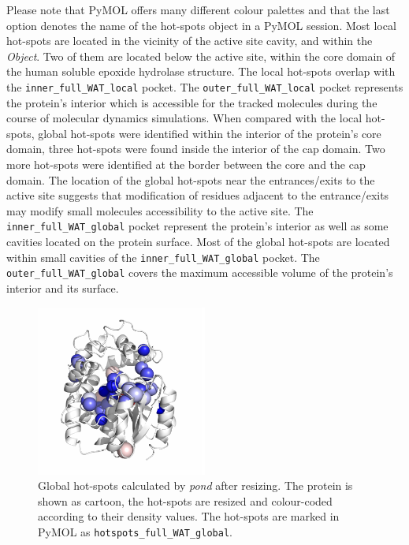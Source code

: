 \documentclass[9pt,tutorial]{livecoms}
\begin{document}
Please note that PyMOL offers many different colour palettes and that the last option denotes the name of the hot-spots object in a PyMOL session. Most local hot-spots are located in the vicinity of the active site cavity, and within the \emph{Object}. Two of them are located below the active site, within the core domain of the human soluble epoxide hydrolase structure. The local hot-spots overlap with the \texttt{inner\_full\_WAT\_local} pocket. The \texttt{outer\_full\_WAT\_local} pocket represents the protein's interior which is accessible for the tracked molecules during the course of molecular dynamics simulations. When compared with the local hot-spots, global hot-spots were identified within the interior of the protein's core domain, three hot-spots were found inside the interior of the cap domain. Two more hot-spots were identified at the border between the core and the cap domain. The location of the global hot-spots near the entrances/exits to the active site suggests that modification of residues adjacent to the entrance/exits may modify small molecules accessibility to the active site. The \texttt{inner\_full\_WAT\_global} pocket represent the protein's interior as well as some cavities located on the protein surface. Most of the global hot-spots are located within small cavities of the \texttt{inner\_full\_WAT\_global} pocket. The \texttt{outer\_full\_WAT\_global} covers the maximum accessible volume of the protein's interior and its surface.

\begin{figure}[ht!]
\centering
\includegraphics[width=0.5\textwidth]{Tut4.4.png}
\caption{Global hot-spots calculated by \textit{pond} after resizing. The protein is shown as cartoon, the hot-spots are resized and colour-coded according to their density values. The hot-spots are marked in PyMOL as \texttt{hotspots\_full\_WAT\_global}.}
\label{Tut4.4}
\end{figure}
\end{document}
